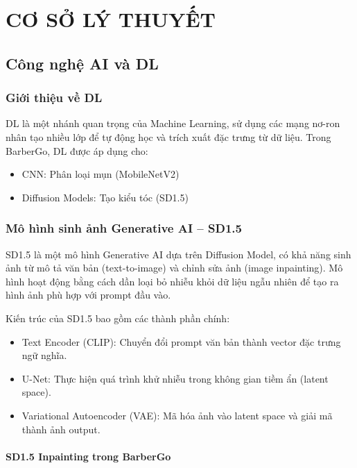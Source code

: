 \chapter{CƠ SỞ LÝ THUYẾT}

\section{Công nghệ AI và DL}

\subsection{Giới thiệu về DL}

DL là một nhánh quan trọng của Machine Learning, sử dụng các mạng nơ-ron nhân tạo nhiều lớp để tự động học và trích xuất đặc trưng từ dữ liệu. 
Trong BarberGo, DL được áp dụng cho:
\begin{itemize}
    \item CNN: Phân loại mụn (MobileNetV2)
    \item Diffusion Models: Tạo kiểu tóc (SD1.5)
\end{itemize}

\subsection{Mô hình sinh ảnh Generative AI – SD1.5}

SD1.5 là một mô hình Generative AI dựa trên Diffusion Model, có khả năng sinh ảnh từ mô tả văn bản (text-to-image) và chỉnh sửa ảnh (image inpainting). Mô hình hoạt động bằng cách dần loại bỏ nhiễu khỏi dữ liệu ngẫu nhiên để tạo ra hình ảnh phù hợp với prompt đầu vào.

Kiến trúc của SD1.5 bao gồm các thành phần chính:
\begin{itemize}
    \item Text Encoder (CLIP): Chuyển đổi prompt văn bản thành vector đặc trưng ngữ nghĩa.
    \item U-Net: Thực hiện quá trình khử nhiễu trong không gian tiềm ẩn (latent space).
    \item Variational Autoencoder (VAE): Mã hóa ảnh vào latent space và giải mã thành ảnh output.
\end{itemize}

\subsubsection{SD1.5 Inpainting trong BarberGo}

